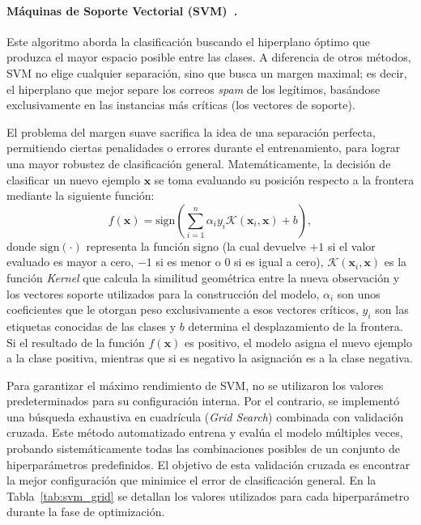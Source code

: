 \documentclass[a4paper,11pt ,openany]{book}
\begin{document}
\paragraph{Máquinas de Soporte Vectorial (SVM)~\cite{cortes1995support}.} {Este algoritmo aborda la clasificación buscando el hiperplano óptimo que produzca el mayor espacio posible entre las clases. A diferencia de otros métodos, SVM no elige cualquier separación, sino que busca un margen maximal; es decir, el hiperplano que mejor separe los correos \textit{spam} de los legítimos, basándose exclusivamente en las instancias más críticas (los vectores de soporte).

El problema del margen suave sacrifica la idea de una separación perfecta, permitiendo ciertas penalidades o errores durante el entrenamiento, para lograr una mayor robustez de clasificación general.
Matemáticamente, la decisión de clasificar un nuevo ejemplo $\boldsymbol{x}$ se toma evaluando su posición respecto a la frontera mediante la siguiente función:
\begin{equation}
f(\boldsymbol{x}) = \text{sign}\left( \sum_{i=1}^{n} \alpha_i y_i \mathcal{K}(\boldsymbol{x}_i, \boldsymbol{x}) + b \right)
\label{eq:svm_decision},
\end{equation}
donde $\text{sign}(\cdot)$ representa la función signo (la cual devuelve $+1$ si el valor evaluado es mayor a cero, $-1$ si es menor o $0$ si es igual a cero), $\mathcal{K}(\boldsymbol{x}_i, \boldsymbol{x})$ es la función \textit{Kernel} que calcula la similitud geométrica entre la nueva observación y los vectores soporte utilizados para la construcción del modelo, $\alpha_i$ son unos coeficientes que le otorgan peso exclusivamente a esos vectores críticos, $y_i$ son las etiquetas conocidas de las clases y $b$ determina el desplazamiento de la frontera. Si el resultado de la función $f(\boldsymbol{x})$ es positivo, el modelo asigna el nuevo ejemplo a la clase positiva, mientras que si es negativo la asignación es a la clase negativa.


Para garantizar el máximo rendimiento de SVM, no se utilizaron los valores predeterminados para su configuración interna. Por el contrario, se implementó una búsqueda exhaustiva en cuadrícula (\textit{Grid Search}) combinada con validación cruzada. 
Este método automatizado entrena y evalúa el modelo múltiples veces, probando sistemáticamente todas las combinaciones posibles de un conjunto de hiperparámetros predefinidos. El objetivo de esta validación cruzada es encontrar la mejor configuración que minimice el error de clasificación general. En la Tabla~\ref{tab:svm_grid} se detallan los valores utilizados para cada hiperparámetro durante la fase de optimización.

}
\end{document}
